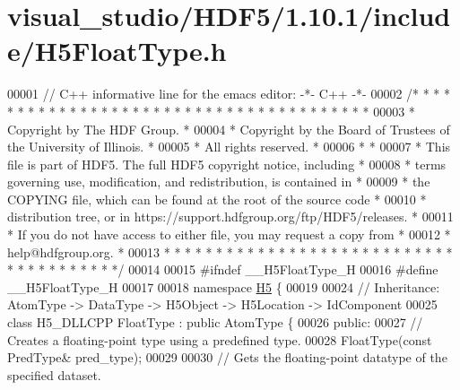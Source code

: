 \hypertarget{visual__studio_2_h_d_f5_21_810_81_2include_2_h5_float_type_8h_source}{}\section{visual\+\_\+studio/\+H\+D\+F5/1.10.1/include/\+H5\+Float\+Type.h}
\label{visual__studio_2_h_d_f5_21_810_81_2include_2_h5_float_type_8h_source}

\begin{DoxyCode}
00001 \textcolor{comment}{// C++ informative line for the emacs editor: -*- C++ -*-}
00002 \textcolor{comment}{/* * * * * * * * * * * * * * * * * * * * * * * * * * * * * * * * * * * * * * *}
00003 \textcolor{comment}{ * Copyright by The HDF Group.                                               *}
00004 \textcolor{comment}{ * Copyright by the Board of Trustees of the University of Illinois.         *}
00005 \textcolor{comment}{ * All rights reserved.                                                      *}
00006 \textcolor{comment}{ *                                                                           *}
00007 \textcolor{comment}{ * This file is part of HDF5.  The full HDF5 copyright notice, including     *}
00008 \textcolor{comment}{ * terms governing use, modification, and redistribution, is contained in    *}
00009 \textcolor{comment}{ * the COPYING file, which can be found at the root of the source code       *}
00010 \textcolor{comment}{ * distribution tree, or in https://support.hdfgroup.org/ftp/HDF5/releases.  *}
00011 \textcolor{comment}{ * If you do not have access to either file, you may request a copy from     *}
00012 \textcolor{comment}{ * help@hdfgroup.org.                                                        *}
00013 \textcolor{comment}{ * * * * * * * * * * * * * * * * * * * * * * * * * * * * * * * * * * * * * * */}
00014 
00015 \textcolor{preprocessor}{#ifndef \_\_H5FloatType\_H}
00016 \textcolor{preprocessor}{#define \_\_H5FloatType\_H}
00017 
00018 \textcolor{keyword}{namespace }\hyperlink{namespace_h5}{H5} \{
00019 
00024 \textcolor{comment}{//  Inheritance: AtomType -> DataType -> H5Object -> H5Location -> IdComponent}
00025 \textcolor{keyword}{class }H5\_DLLCPP FloatType : \textcolor{keyword}{public} AtomType \{
00026    \textcolor{keyword}{public}:
00027         \textcolor{comment}{// Creates a floating-point type using a predefined type.}
00028         FloatType(\textcolor{keyword}{const} PredType& pred\_type);
00029 
00030         \textcolor{comment}{// Gets the floating-point datatype of the specified dataset.}

\end{DoxyCode}
